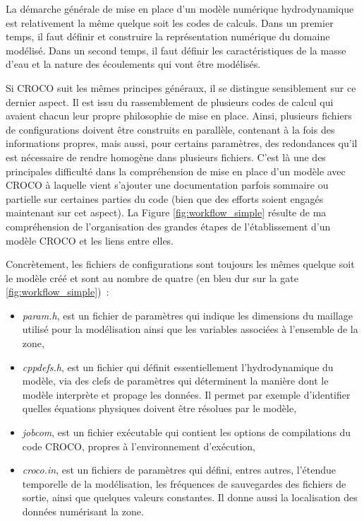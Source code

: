 \documentclass[10pt,a4paper,titlepage]{article}
\begin{document}
La démarche générale de mise en place d'un modèle numérique hydrodynamique est relativement la même quelque soit les codes de calculs. Dans un premier temps, il faut définir et construire la représentation numérique du domaine modélisé. Dans un second temps, il faut définir les caractéristiques de la masse d'eau et la nature des écoulements qui vont être modélisés.

Si CROCO suit les mêmes principes généraux, il se distingue sensiblement sur ce dernier aspect. Il est issu du rassemblement de plusieurs codes de calcul qui avaient chacun leur propre philosophie de mise en place.  Ainsi, plusieurs fichiers de configurations doivent être construits en parallèle, contenant à la fois des informations propres, mais aussi, pour certains paramètres, des redondances qu'il est nécessaire de rendre homogène dans plusieurs fichiers. C'est là une des principales difficulté dans la compréhension de mise en place d'un modèle avec CROCO à laquelle vient s'ajouter une documentation parfois sommaire ou partielle sur certaines parties du code (bien que des efforts soient engagés maintenant sur cet aspect). La Figure \ref{fig:workflow_simple} résulte de ma compréhension de l'organisation des grandes étapes de l'établissement d'un modèle CROCO et les liens entre elles.

Concrètement, les fichiers de configurations sont toujours les mêmes quelque soit le modèle créé et sont au nombre de quatre (en bleu dur sur la gate \ref{fig:workflow_simple})~:
\begin{itemize}
    \item \textit{param.h}, est un fichier de paramètres qui indique les dimensions du maillage utilisé pour la modélisation ainsi que les variables associées à l'ensemble de la zone,
    \item \textit{cppdefs.h}, est un fichier qui définit essentiellement l'hydrodynamique du modèle, via des clefs de paramètres qui déterminent la manière dont le modèle interprète et propage les données. Il permet par exemple d'identifier quelles équations physiques doivent être résolues par le modèle,
    \item \textit{jobcom}, est un fichier exécutable qui contient les options de compilations du code CROCO, propres à l'environnement d’exécution,
    \item \textit{croco.in}, est un fichiers de paramètres qui défini, entres autres, l'étendue temporelle de la modélisation, les fréquences de sauvegardes des fichiers de sortie, ainsi que quelques valeurs constantes. Il donne aussi la localisation des données numérisant la zone.
\end{itemize}
\end{document}
